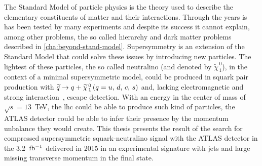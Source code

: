 The Standard Model of particle physics is the theory used to describe the
elementary constituents of matter and their interactions. Through the years is
has been tested by many experiments and despite its success it cannot explain,
among other problems, the so called hierarchy and dark matter problems described
in \cref{cha:beyond-stand-model}. Supersymmetry is an extension of the Standard
Model that could solve these issues by introducing new particles. The lightest
of these particles, the so called neutralino (and denoted by
$\widetilde{\chi}_{\, 1}^{\, 0}$), in the context of a minimal supersymmetric
model, could be produced in squark pair production with $\widetilde{q} \rightarrow q + \widetilde{\chi}_{\, 1}^{\, 0}\, (q = u,\, d,\, c,\, s)$ and,
lacking electromagnetic and strong interaction~\cite{MSSMIntro}, escape
detection. With an energy in the center of mass of $\sqrt{s} = 13$~TeV, the
\gls{lhc} could be able to produce such kind of particles, the ATLAS detector
could be able to infer their presence by the momentum unbalance they would
create. This thesis presents the result of the search for compressed
supersymmetric squark-neutralino signal with the ATLAS detector in the
3.2~$\mbox{fb$^{-1}$}$ delivered in 2015 in an experimental signature with jets and large
missing transverse momentum in the final state.
